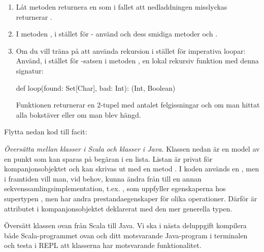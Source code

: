 \begin{enumerate}
\item Låt metoden  returnera en  som i fallet att nedladdningen misslyckas returnerar .

\item I metoden , i stället för - använd  och dess smidiga metoder  och .  

\item Om du vill träna på att använda rekursion i stället för imperativa loopar: Använd, i stället för -satsen i metoden , en lokal rekursiv funktion med denna signatur: 
\begin{Code}
  def loop(found: Set[Char], bad: Int): (Int, Boolean)
\end{Code}
Funktionen  returnerar en 2-tupel med antalet felgissningar och  om man hittat alla bokstäver eller  om man blev hängd. 

\end{enumerate}

\TODO Flytta nedan kod till facit:




\Task \emph{Översätta mellan klasser i Scala och klasser i Java.}  
Klassen  nedan är en model av en punkt som kan sparas på begäran i en lista. Listan är privat för kompanjonsobjektet och kan skrivas ut med en metod . I koden används en , men i framtiden vill man, vid behov, kunna ändra från  till en annan sekvenssamlingsimplementation, t.ex. , som uppfyller egenskaperna hos supertypen , men har andra prestandaegenskaper för olika operationer. Därför är attributet  i kompanjonsobjektet deklarerat med den mer generella typen.


\Subtask Översätt klassen  ovan från Scala till Java. Vi ska i nästa deluppgift kompilera både Scala-programmet ovan och ditt motsvarande Java-program i terminalen och testa i REPL att klasserna har motsvarande funktionalitet. 

